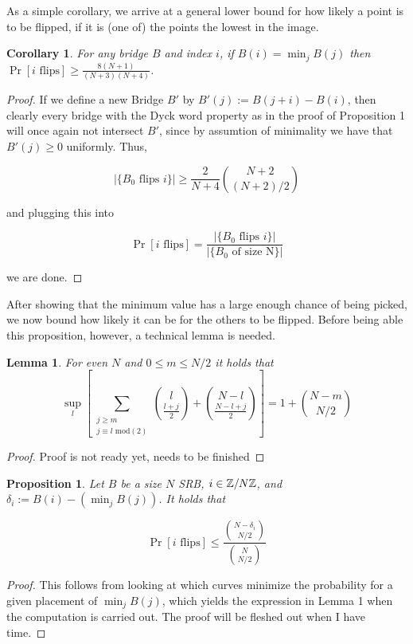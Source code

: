 \documentclass{article}
\newtheorem{lemma}{Lemma}
\newtheorem{corollary}{Corollary}
\newtheorem{proposition}{Proposition}
\theoremstyle{definition}
\begin{document}
As a simple corollary, we arrive at a general lower bound for how likely a point is to be flipped, if it is (one of) the points the lowest in the image.

\begin{corollary} For any bridge $B$ and index $i$, if $B(i)=\min_jB(j)$ then $\Pr[i \mathrm{\,\, flips}]\geq \frac{8(N+1)}{(N+3)(N+4)}$.
\end{corollary}
\begin{proof} If we define a new Bridge $B'$ by $B'(j):=B(j+i)-B(i)$, then clearly every bridge with the Dyck word property as in the proof of Proposition 1 will once again not intersect $B'$, since by assumtion of minimality we have that $B'(j)\geq0$ uniformly. Thus,

$$|\{B_0 \,\, \mathrm{flips\,\, }i\}|\geq \frac{2}{N+4}{N+2\choose (N+2)/2}$$

and plugging this into

$$\Pr[i\,\,\mathrm{flips}]=\frac{|\{B_0 \,\, \mathrm{flips\,\, }i\}|}{|\{B_0\,\,\mathrm{of\,\,size\,\,N}\}|}$$

we are done.
\end{proof}

After showing that the minimum value has a large enough chance of being picked, we now bound how likely it can be for the others to be flipped. Before being able this proposition, however, a technical lemma is needed.

\begin{lemma}

For even $N$ and $0\leq m\leq N/2$ it holds that
$$\sup_{l}\left[\sum_{\substack{j\geq m \\ j\equiv l \,\,\mathrm{mod}(2)}}{l \choose \frac{l+j}{2}}+{N-l \choose \frac{N-l+j}{2}}\right]=1+{N-m \choose N/2}$$
\end{lemma}
\begin{proof} Proof is not ready yet, needs to be finished
\end{proof}

\begin{proposition} Let $B$ be a size $N$ SRB, $i\in \mathbb{Z}/N\mathbb{Z}$, and $\delta_i:=B(i)-\left(\min_{j}B(j)\right)$. It holds that

$$\Pr[i\,\,\mathrm{flips}]\leq \frac{{N-\delta_i \choose N/2}}{{N \choose N/2}}$$

\end{proposition}

\begin{proof} This follows from looking at which curves minimize the probability for a given placement of $\min_{j}B(j)$, which yields the expression in Lemma 1 when the computation is carried out. The proof will be fleshed out when I have time.
\end{proof}




\end{document}
